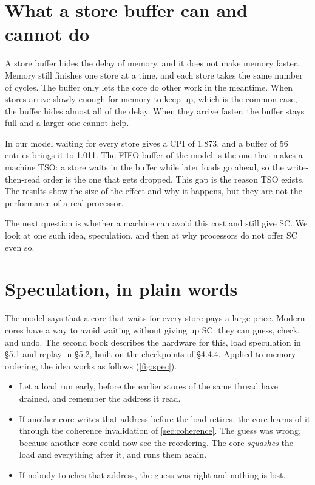 \section{What a store buffer can and cannot do}
\label{sec:bufferlimits}

A store buffer hides the delay of memory, and it does not make memory faster. Memory still finishes one store at a time, and each store takes the same number of cycles. The buffer only lets the core do other work in the meantime. When stores arrive slowly enough for memory to keep up, which is the common case, the buffer hides almost all of the delay. When they arrive faster, the buffer stays full and a larger one cannot help.

In our model waiting for every store gives a CPI of 1.873, and a buffer of 56 entries brings it to 1.011. The FIFO buffer of the model is the one that makes a machine TSO: a store waits in the buffer while later loads go ahead, so the write-then-read order is the one that gets dropped. This gap is the reason TSO exists. The results show the size of the effect and why it happens, but they are not the performance of a real processor.

The next question is whether a machine can avoid this cost and still give SC. We look at one such idea, speculation, and then at why processors do not offer SC even so.

\section{Speculation, in plain words}
\label{sec:spec}

The model says that a core that waits for every store pays a large price. Modern cores have a way to avoid waiting without giving up SC: they can guess, check, and undo. The second book describes the hardware for this, load speculation in \S5.1 and replay in \S5.2, built on the checkpoints of \S4.4.4\cite{sarangiNextGen}. Applied to memory ordering, the idea works as follows (\cref{fig:spec}).
\begin{itemize}
\item Let a load run early, before the earlier stores of the same thread have drained, and remember the address it read.
\item If another core writes that address before the load retires, the core learns of it through the coherence invalidation of \cref{sec:coherence}. The guess was wrong, because another core could now see the reordering. The core \emph{squashes} the load and everything after it, and runs them again.
\item If nobody touches that address, the guess was right and nothing is lost.
\end{itemize}

